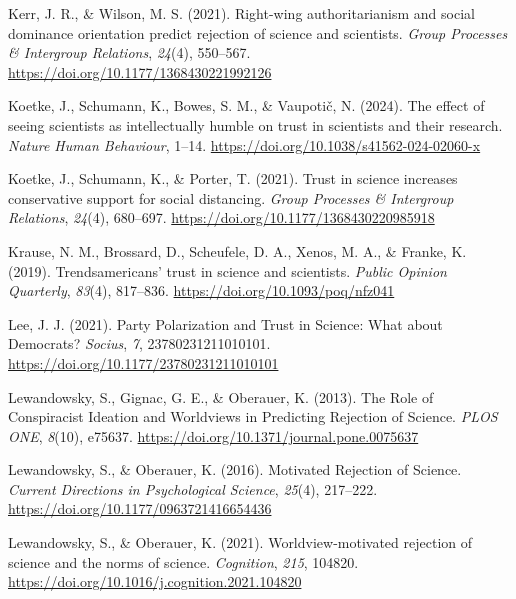 \documentclass[
  jou,
  floatsintext,
  longtable,
  nolmodern,
  notxfonts,
  notimes,
  colorlinks=true,linkcolor=blue,citecolor=blue,urlcolor=blue]{apa7}
\newlength{\cslhangindent}
\newenvironment{CSLReferences}[2] %
 {\begin{list}{}{%
  \setlength{\itemindent}{0pt}
  \setlength{\leftmargin}{0pt}
  \setlength{\parsep}{0pt}
  \ifodd #1
   \setlength{\leftmargin}{\cslhangindent}
   \setlength{\itemindent}{-1\cslhangindent}
  \fi
  \setlength{\itemsep}{#2\baselineskip}}}
 {\end{list}}
\begin{document}
\begin{CSLReferences}{1}{0}
Kerr, J. R., \& Wilson, M. S. (2021). Right-wing authoritarianism and
social dominance orientation predict rejection of science and
scientists. \emph{Group Processes \& Intergroup Relations},
\emph{24}(4), 550--567. \url{https://doi.org/10.1177/1368430221992126}

Koetke, J., Schumann, K., Bowes, S. M., \& Vaupotič, N. (2024). The
effect of seeing scientists as intellectually humble on trust in
scientists and their research. \emph{Nature Human Behaviour}, 1--14.
\url{https://doi.org/10.1038/s41562-024-02060-x}

Koetke, J., Schumann, K., \& Porter, T. (2021). Trust in science
increases conservative support for social distancing. \emph{Group
Processes \& Intergroup Relations}, \emph{24}(4), 680--697.
\url{https://doi.org/10.1177/1368430220985918}

Krause, N. M., Brossard, D., Scheufele, D. A., Xenos, M. A., \& Franke,
K. (2019). Trends{\textemdash}americans{'} trust in science and
scientists. \emph{Public Opinion Quarterly}, \emph{83}(4), 817--836.
\url{https://doi.org/10.1093/poq/nfz041}

Lee, J. J. (2021). Party Polarization and Trust in Science: What about
Democrats? \emph{Socius}, \emph{7}, 23780231211010101.
\url{https://doi.org/10.1177/23780231211010101}

Lewandowsky, S., Gignac, G. E., \& Oberauer, K. (2013). The Role of
Conspiracist Ideation and Worldviews in Predicting Rejection of Science.
\emph{PLOS ONE}, \emph{8}(10), e75637.
\url{https://doi.org/10.1371/journal.pone.0075637}

Lewandowsky, S., \& Oberauer, K. (2016). Motivated Rejection of Science.
\emph{Current Directions in Psychological Science}, \emph{25}(4),
217--222. \url{https://doi.org/10.1177/0963721416654436}

Lewandowsky, S., \& Oberauer, K. (2021). Worldview-motivated rejection
of science and the norms of science. \emph{Cognition}, \emph{215},
104820. \url{https://doi.org/10.1016/j.cognition.2021.104820}


\end{CSLReferences}
\end{document}
